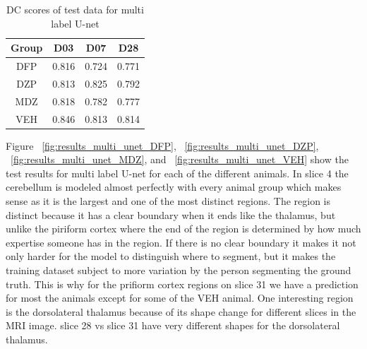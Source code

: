 \begin{table}[tbh]
\renewcommand{\arraystretch}{1}
\centering
\begin{tabular}{|c|c|c|c|}
\hline
\textbf{Group} & \textbf{D03}& \textbf{D07}& \textbf{D28}\\
\hline
DFP & 0.816 & 0.724 & 0.771\\      
\hline
DZP & 0.813 & 0.825 & 0.792\\
\hline
MDZ & 0.818 & 0.782 & 0.777\\ 
\hline
VEH & 0.846 & 0.813 & 0.814\\ 
\hline
\end{tabular}
\caption{DC scores of test data for multi label U-net}
\label{tab.multi_model_results_unet}
\end{table}

Figure ~\ref{fig:results_multi_unet_DFP}, ~\ref{fig:results_multi_unet_DZP}, ~\ref{fig:results_multi_unet_MDZ}, and ~\ref{fig:results_multi_unet_VEH} show the test results for multi label U-net for each of the different animals.
In slice 4 the cerebellum is modeled almost perfectly with every animal group which makes sense as it is the largest and one of the most distinct regions. 
The region is distinct because it has a clear boundary when it ends like the thalamus, but unlike the piriform cortex where the end of the region is determined by how much expertise someone has in the region. 
If there is no clear boundary it makes it not only harder for the model to distinguish where to segment, but it makes the training dataset subject to more variation by the person segmenting the ground truth. 
This is why for the prifiorm cortex regions on slice 31 we have a prediction for most the animals except for some of the VEH animal. 
One interesting region is the dorsolateral thalamus because of its shape change for different slices in the MRI image. slice 28 vs slice 31 have very different shapes for the dorsolateral thalamus. 



